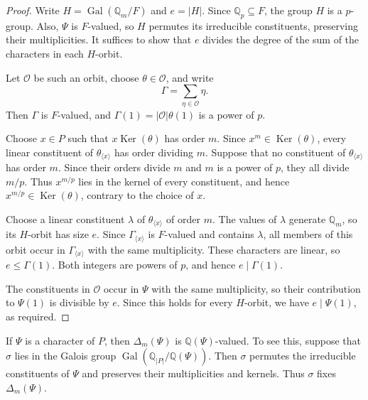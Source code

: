 \documentclass[reqno]{amsart}
\theoremstyle{definition}
\theoremstyle{remark}
\numberwithin{equation}{section}
\DeclareMathOperator{\Ker}{Ker}
\DeclareMathOperator{\Gal}{Gal}
\theoremstyle{plain}
\begin{document}
\begin{proof}
Write $H=\Gal(\mathbb{Q}_m/F)$ and $e=|H|$.
Since $\mathbb{Q}_p\subseteq F$, the group $H$ is a $p$-group.
Also, $\Psi$ is $F$-valued, so $H$ permutes its irreducible
constituents, preserving their multiplicities.
It  suffices to show that $e$ divides the degree of the sum of the characters in each $H$-orbit.

Let $\mathcal{O}$ be such an orbit, choose
$\theta\in\mathcal{O}$, and write
\[
  \Gamma=\sum_{\eta\in\mathcal{O}}\eta.
\]
Then $\Gamma$ is $F$-valued, and
$\Gamma(1)=|\mathcal{O}|\theta(1)$ is a power of $p$.

Choose $x\in P$ such that $x\Ker(\theta)$ has order $m$.
Since $x^m\in\Ker(\theta)$, every linear constituent of
$\theta_{\langle x\rangle}$ has order dividing $m$.
Suppose that no constituent of $\theta_{\langle x\rangle}$
has order $m$. Since their orders divide $m$ and $m$ is
a power of $p$, they all divide $m/p$.
Thus $x^{m/p}$ lies in the kernel of every constituent,
and hence $x^{m/p}\in\Ker(\theta)$, contrary to the choice of $x$.

Choose a linear constituent $\lambda$ of
$\theta_{\langle x\rangle}$ of order $m$. The values of $\lambda$ generate $\mathbb{Q}_m$, so its
$H$-orbit has size $e$.
Since $\Gamma_{\langle x\rangle}$ is $F$-valued and contains
$\lambda$, all members of this orbit occur in
$\Gamma_{\langle x\rangle}$ with the same multiplicity.
These characters are linear, so $e\leq\Gamma(1)$.
Both integers are powers of $p$, and hence $e\mid\Gamma(1)$.

The constituents in $\mathcal{O}$ occur in $\Psi$ with
the same multiplicity, so their contribution to $\Psi(1)$
is divisible by $e$.
Since this holds for every $H$-orbit, we have $e\mid\Psi(1)$,
as required.
\end{proof}

If $\Psi$ is a character of $P$, then $\Delta_m(\Psi)$ is
$\mathbb{Q}(\Psi)$-valued.
To see this, suppose that $\sigma$ lies in the Galois group
$\Gal(\mathbb{Q}_{|P|}/\mathbb{Q}(\Psi))$.
Then $\sigma$ permutes the irreducible constituents of $\Psi$
and preserves their multiplicities and kernels.
Thus $\sigma$ fixes $\Delta_m(\Psi)$.
\end{document}
